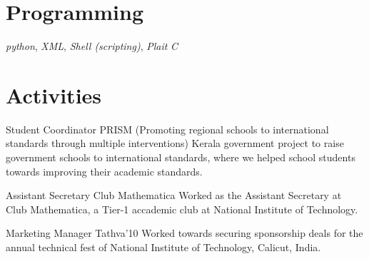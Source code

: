 \documentclass[11pt,a4paper,sans]{moderncv}
\begin{document}

\section{Programming}

           {
               \textit{python},
               \textit{XML},
               \textit{Shell (scripting)},
               \textit{Plait}
           }
           {\textit{C}}


\section{Activities}

            {Student Coordinator}
            {
                PRISM (Promoting regional schools to international standards
                through multiple interventions)
            }
            {}
            {}
            {
                Kerala government project to raise government schools to
                international standards, where we helped school students towards
                improving their academic standards.
            }

            {Assistant Secretary}
            {Club Mathematica}
            {}
            {}
            {
                Worked as the Assistant Secretary at Club Mathematica, a Tier-1
                accademic club at National Institute of Technology.
            }

            {Marketing Manager}
            {Tathva'10}
            {}
            {}
            {
                Worked towards securing sponsorship deals for the annual
                technical fest of National Institute of Technology, Calicut,
                India.
            }

\end{document}
